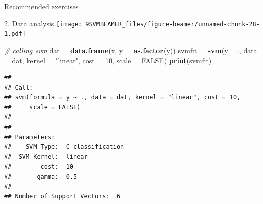 \documentclass[ignorenonframetext,]{beamer}
\newenvironment{Shaded}{\begin{snugshade}}{\end{snugshade}}
\newcommand{\KeywordTok}[1]{\textcolor[rgb]{0.13,0.29,0.53}{\textbf{#1}}}
\newcommand{\DataTypeTok}[1]{\textcolor[rgb]{0.13,0.29,0.53}{#1}}
\newcommand{\DecValTok}[1]{\textcolor[rgb]{0.00,0.00,0.81}{#1}}
\newcommand{\StringTok}[1]{\textcolor[rgb]{0.31,0.60,0.02}{#1}}
\newcommand{\CommentTok}[1]{\textcolor[rgb]{0.56,0.35,0.01}{\textit{#1}}}
\newcommand{\OtherTok}[1]{\textcolor[rgb]{0.56,0.35,0.01}{#1}}
\newcommand{\OperatorTok}[1]{\textcolor[rgb]{0.81,0.36,0.00}{\textbf{#1}}}
\newcommand{\NormalTok}[1]{#1}
\begin{document}
\begin{frame}[fragile]{Recommended exercises}
\begin{block}{2. Data analysis}
\texttt{[image: 9SVMBEAMER\_files/figure-beamer/unnamed-chunk-28-1.pdf]}

\begin{Shaded}
\begin{Highlighting}[]
\CommentTok{# calling svm}
\NormalTok{dat =}\StringTok{ }\KeywordTok{data.frame}\NormalTok{(x, }\DataTypeTok{y =} \KeywordTok{as.factor}\NormalTok{(y))}
\NormalTok{svmfit =}\StringTok{ }\KeywordTok{svm}\NormalTok{(y }\OperatorTok{~}\StringTok{ }\NormalTok{., }\DataTypeTok{data =}\NormalTok{ dat, }\DataTypeTok{kernel =} \StringTok{"linear"}\NormalTok{, }\DataTypeTok{cost =} \DecValTok{10}\NormalTok{, }\DataTypeTok{scale =} \OtherTok{FALSE}\NormalTok{)}
\KeywordTok{print}\NormalTok{(svmfit)}
\end{Highlighting}
\end{Shaded}

\begin{verbatim}
## 
## Call:
## svm(formula = y ~ ., data = dat, kernel = "linear", cost = 10, 
##     scale = FALSE)
## 
## 
## Parameters:
##    SVM-Type:  C-classification 
##  SVM-Kernel:  linear 
##        cost:  10 
##       gamma:  0.5 
## 
## Number of Support Vectors:  6
\end{verbatim}


\end{block}
\end{frame}
\end{document}
